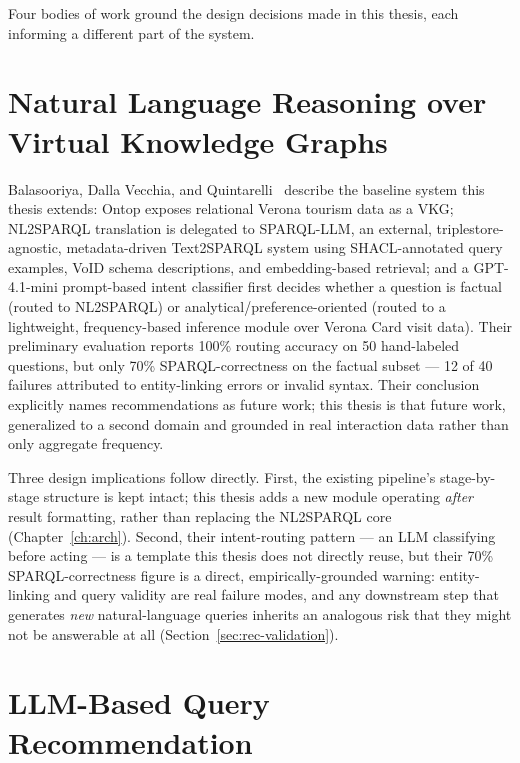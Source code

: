 Four bodies of work ground the design decisions made in this thesis, each informing a different
part of the system.

\section{Natural Language Reasoning over Virtual Knowledge Graphs}
\label{sec:rel-nl2sparql}

Balasooriya, Dalla Vecchia, and Quintarelli~\cite{balasooriya2026} describe the baseline system
this thesis extends: Ontop exposes relational Verona tourism data as a VKG; NL2SPARQL translation
is delegated to SPARQL-LLM, an external, triplestore-agnostic, metadata-driven Text2SPARQL system
using SHACL-annotated query examples, VoID schema descriptions, and embedding-based retrieval; and
a GPT-4.1-mini prompt-based intent classifier first decides whether a question is factual (routed
to NL2SPARQL) or analytical/preference-oriented (routed to a lightweight, frequency-based inference
module over Verona Card visit data). Their preliminary evaluation reports 100\% routing accuracy on
50 hand-labeled questions, but only 70\% SPARQL-correctness on the factual subset --- 12 of 40
failures attributed to entity-linking errors or invalid syntax. Their conclusion explicitly names
recommendations as future work; this thesis is that future work, generalized to a second domain and
grounded in real interaction data rather than only aggregate frequency.

Three design implications follow directly. First, the existing pipeline's stage-by-stage structure
is kept intact; this thesis adds a new module operating \emph{after} result formatting, rather than
replacing the NL2SPARQL core (Chapter~\ref{ch:arch}). Second, their intent-routing pattern --- an
LLM classifying before acting --- is a template this thesis does not directly reuse, but their
70\% SPARQL-correctness figure is a direct, empirically-grounded warning: entity-linking and query
validity are real failure modes, and any downstream step that generates \emph{new} natural-language
queries inherits an analogous risk that they might not be answerable at all
(Section~\ref{sec:rec-validation}).

\section{LLM-Based Query Recommendation}
\label{sec:rel-gqr}

